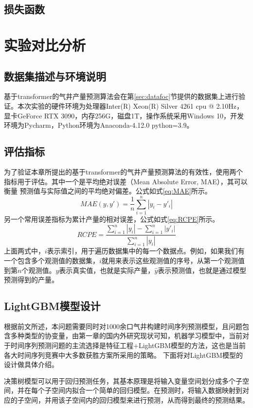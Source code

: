 \subsection{损失函数}
\section{实验对比分析}
\subsection{数据集描述与环境说明}
基于transformer的气井产量预测算法会在第\ref{sec:datafoc}节提供的数据集上进行验证。本次实验的硬件环境为处理器Inter(R) Xeon(R) Silver 4261 cpu @ 2.10Hz，
显卡GeForce RTX 3090，内存256G，磁盘1T，操作系统采用Windows 10，开发环境为Pycharm，Python环境为Anaconda-4.12.0 python=3.9。
\subsection{评估指标}
为了验证本章所提出的基于transformer的气井产量预测算法的有效性，使用两个指标用于评估。其中一个是平均绝对误差（Mean Absolute Error, MAE），其可以衡量
预测值与实际值之间的平均绝对偏差。公式如式\eqref{eq:MAE}所示。
\begin{equation}
    MAE(y, y') = \frac{1}{n} \sum_{i=1}^{n} |y_i - y'_i|
    \label{eq:MAE}
\end{equation}
另一个常用误差指标为累计产量的相对误差，公式如式\eqref{eq:RCPE}所示。
\begin{equation}
    RCPE = \frac{\sum_{i=1}^{n} |y_i| - \sum_{i=1}^{n} |y'_i|}{\sum_{i=1}^{n} |y_i|}
    \label{eq:RCPE}
\end{equation}
上面两式中，$i$表示索引，用于遍历数据集中的每一个数据点。例如，如果我们有一个包含多个观测值的数据集，$i$就用来表示这些观测值的序号，从第一个观测值
到第$n$个观测值。$y$表示真实值，也就是实际产量，$\hat{y}$表示预测值，也就是通过模型预测得到的产量。
\subsection{LightGBM模型设计}
根据前文所述，本问题需要同时对1000余口气井构建时间序列预测模型，且问题包含多种类型的协变量，由第一章的国内外研究现状可知，机器学习模型中，当前对于时间序列预测问题的主流选择是特征工程+LightGBM模型的方法，这也是当前各大时间序列竞赛中大多数获胜方案所采用的策略。
下面将对LightGBM模型的设计做具体介绍。

决策树模型可以用于回归预测任务，其基本原理是将输入变量空间划分成多个子空间，并在每个子空间内拟合一个简单的回归模型。在预测时，将输入数据映射到对应的子空间，并用该子空间内的回归模型来进行预测，从而得到最终的预测结果。

